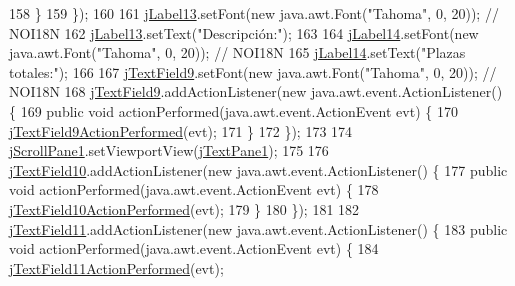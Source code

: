 \begin{DoxyCode}
158             \}
159         \});
160 
161         \mbox{\hyperlink{classsoftware_1_1parasoftware3_a7b6fbb00c7d61828f62e29c35188d960}{jLabel13}}.setFont(\textcolor{keyword}{new} java.awt.Font(\textcolor{stringliteral}{"Tahoma"}, 0, 20)); \textcolor{comment}{// NOI18N}
162         \mbox{\hyperlink{classsoftware_1_1parasoftware3_a7b6fbb00c7d61828f62e29c35188d960}{jLabel13}}.setText(\textcolor{stringliteral}{"Descripción:"});
163 
164         \mbox{\hyperlink{classsoftware_1_1parasoftware3_a8cf21f19b1d00a92b53875d6c27aed2f}{jLabel14}}.setFont(\textcolor{keyword}{new} java.awt.Font(\textcolor{stringliteral}{"Tahoma"}, 0, 20)); \textcolor{comment}{// NOI18N}
165         \mbox{\hyperlink{classsoftware_1_1parasoftware3_a8cf21f19b1d00a92b53875d6c27aed2f}{jLabel14}}.setText(\textcolor{stringliteral}{"Plazas totales:"});
166 
167         \mbox{\hyperlink{classsoftware_1_1parasoftware3_a9fe814b0f2e84f9047438996abdea4a3}{jTextField9}}.setFont(\textcolor{keyword}{new} java.awt.Font(\textcolor{stringliteral}{"Tahoma"}, 0, 20)); \textcolor{comment}{// NOI18N}
168         \mbox{\hyperlink{classsoftware_1_1parasoftware3_a9fe814b0f2e84f9047438996abdea4a3}{jTextField9}}.addActionListener(\textcolor{keyword}{new} java.awt.event.ActionListener() \{
169             \textcolor{keyword}{public} \textcolor{keywordtype}{void} actionPerformed(java.awt.event.ActionEvent evt) \{
170                 \mbox{\hyperlink{classsoftware_1_1parasoftware3_a40195e49c216f9f4f41678240d0ffc1a}{jTextField9ActionPerformed}}(evt);
171             \}
172         \});
173 
174         \mbox{\hyperlink{classsoftware_1_1parasoftware3_aaeb200a8e3cbd49b6ee645ee670e5af7}{jScrollPane1}}.setViewportView(\mbox{\hyperlink{classsoftware_1_1parasoftware3_a1c8fb0e0c3e99513f7c1245df8f4944a}{jTextPane1}});
175 
176         \mbox{\hyperlink{classsoftware_1_1parasoftware3_a8a6dfd58aa72b1900f0fd0dcf7302181}{jTextField10}}.addActionListener(\textcolor{keyword}{new} java.awt.event.ActionListener() \{
177             \textcolor{keyword}{public} \textcolor{keywordtype}{void} actionPerformed(java.awt.event.ActionEvent evt) \{
178                 \mbox{\hyperlink{classsoftware_1_1parasoftware3_a457010d249cc595838f8cd5a65a94a0a}{jTextField10ActionPerformed}}(evt);
179             \}
180         \});
181 
182         \mbox{\hyperlink{classsoftware_1_1parasoftware3_a1936999315b749f7eb88a81dae02582b}{jTextField11}}.addActionListener(\textcolor{keyword}{new} java.awt.event.ActionListener() \{
183             \textcolor{keyword}{public} \textcolor{keywordtype}{void} actionPerformed(java.awt.event.ActionEvent evt) \{
184                 \mbox{\hyperlink{classsoftware_1_1parasoftware3_a761e7d64ea660c9877635a7951cb801e}{jTextField11ActionPerformed}}(evt);

\end{DoxyCode}
